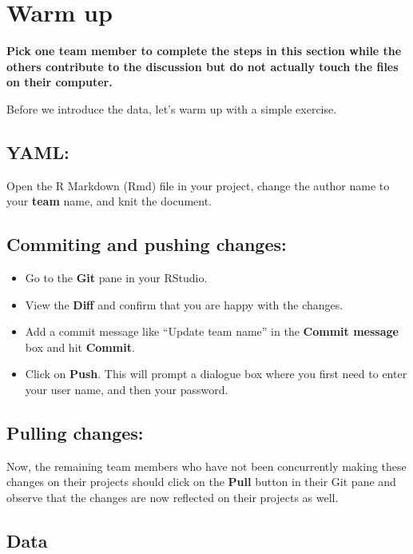 \documentclass[]{book}
\providecommand{\tightlist}{%
  \setlength{\itemsep}{0pt}\setlength{\parskip}{0pt}}
\begin{document}
\section{Warm up}\label{warm-up-1}

\textbf{Pick one team member to complete the steps in this section while
the others contribute to the discussion but do not actually touch the
files on their computer.}

Before we introduce the data, let's warm up with a simple exercise.

\subsection{YAML:}\label{yaml-1}

Open the R Markdown (Rmd) file in your project, change the author name
to your \textbf{team} name, and knit the document.

\subsection{Commiting and pushing
changes:}\label{commiting-and-pushing-changes}

\begin{itemize}
\tightlist
\item
  Go to the \textbf{Git} pane in your RStudio.
\item
  View the \textbf{Diff} and confirm that you are happy with the
  changes.
\item
  Add a commit message like ``Update team name'' in the \textbf{Commit
  message} box and hit \textbf{Commit}.
\item
  Click on \textbf{Push}. This will prompt a dialogue box where you
  first need to enter your user name, and then your password.
\end{itemize}

\subsection{Pulling changes:}\label{pulling-changes}

Now, the remaining team members who have not been concurrently making
these changes on their projects should click on the \textbf{Pull} button
in their Git pane and observe that the changes are now reflected on
their projects as well.

\subsection{Data}\label{data-1}
\end{document}

